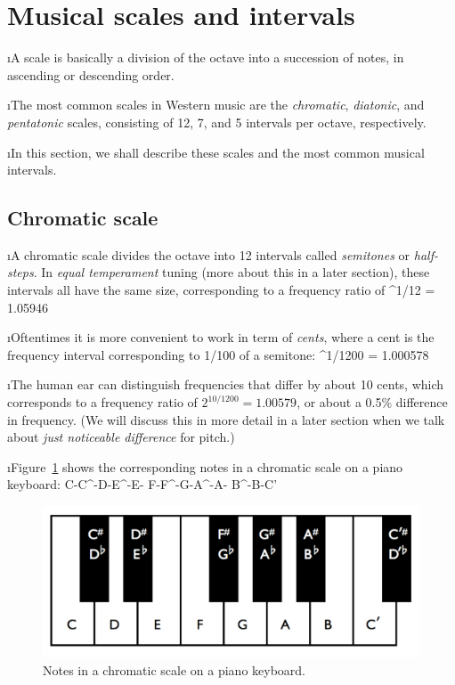 \section{Musical scales and intervals}

\bi

\i A scale is basically a division of the octave 
into a succession of notes, in ascending or descending order.

\i The most common scales in Western music are
the {\em chromatic}, {\em diatonic}, and {\em pentatonic}
scales, consisting of 12, 7, and 5 intervals per octave, 
respectively.

\i In this section, we shall describe these scales and the most
common musical intervals.

\ei

\subsection{Chromatic scale}
\bi

\i A chromatic scale divides the octave into 
12 intervals called {\em semitones} or {\em half-steps}.
In {\em equal temperament} tuning (more about
this in a later section),
these intervals all have
the same size, corresponding to a frequency ratio of 
%
^{1/12} = 1.05946
\ee
%

\i Oftentimes it is more convenient to work in
term of {\em cents}, where a cent is the 
frequency interval corresponding to 1/100 of a semitone:
%
^{1/1200} = 1.000578
\ee
%

\i The human ear can distinguish frequencies
that differ by about 10 cents, which corresponds to
a frequency ratio of $2^{10/1200}=1.00579$,
or about a 0.5\% difference in frequency.
(We will discuss this in more detail in a later
section when we talk about {\em just noticeable
difference} for pitch.)

\i Figure~\ref{f:chromatic-scale-keyboard} shows the
corresponding notes in a chromatic scale on 
a piano keyboard:
%
\be
{\rm C}-{\rm C}^\sharp-{\rm D}-{\rm E}^\flat-{\rm E}-%
{\rm F}-{\rm F}^\sharp-{\rm G}-{\rm A}^\flat-{\rm A}-%
{\rm B}^\flat-{\rm B}-{\rm C}'
\nonumber
\ee
%
\begin{figure}[htbp]
\begin{center}
\includegraphics[width=.7\textwidth]{octave-keys}
\caption{Notes in a chromatic scale on a piano keyboard.}
\label{f:chromatic-scale-keyboard}
\end{center}
\end{figure}
%

